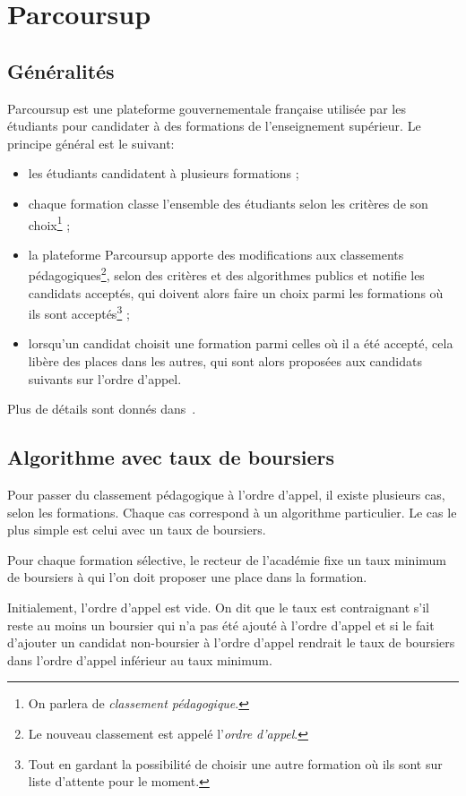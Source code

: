 \section{Parcoursup}
  \subsection{Généralités}
    Parcoursup est une plateforme gouvernementale française utilisée par les étudiants pour candidater à des formations de l'enseignement supérieur. Le principe général est le suivant:
    \begin{itemize}
      \item les étudiants candidatent à plusieurs formations ;
      \item chaque formation classe l'ensemble des étudiants selon les critères de son choix\footnote{On parlera de \emph{classement pédagogique}.} ;
      \item la plateforme Parcoursup apporte des modifications aux classements pédagogiques\footnote{Le nouveau classement est appelé l'\emph{ordre d'appel}.}, selon des critères et des algorithmes publics et notifie les candidats acceptés, qui doivent alors faire un choix parmi les formations où ils sont acceptés\footnote{Tout en gardant la possibilité de choisir une autre formation où ils sont sur liste d'attente pour le moment.} ;
      \item lorsqu'un candidat choisit une formation parmi celles où il a été accepté, cela libère des places dans les autres, qui sont alors proposées aux candidats suivants sur l'ordre d'appel.
    \end{itemize}

    Plus de détails sont donnés dans~\cite{AlgoPS}.

  \subsection{Algorithme avec taux de boursiers}

    Pour passer du classement pédagogique à l'ordre d'appel, il existe plusieurs cas, selon les formations. Chaque cas correspond à un algorithme particulier. Le cas le plus simple est celui avec un taux de boursiers.

    Pour chaque formation sélective, le recteur de l'académie fixe un taux minimum de boursiers à qui l'on doit proposer une place dans la formation.

    Initialement, l'ordre d'appel est vide. On dit que le taux est contraignant s'il reste au moins un boursier qui n'a pas été ajouté à l'ordre d'appel et si le fait d'ajouter un candidat non-boursier à l'ordre d'appel rendrait le taux de boursiers dans l'ordre d'appel inférieur au taux minimum.

